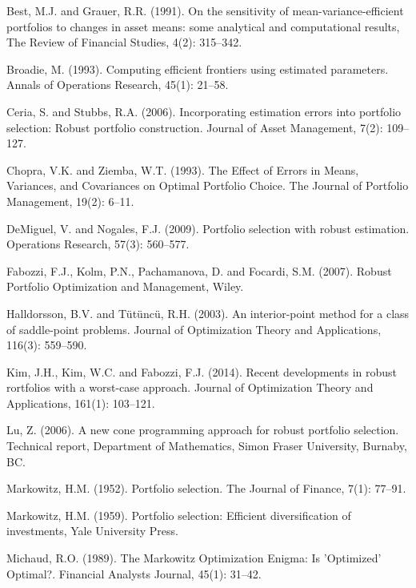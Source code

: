 \documentclass[12pt]{article}
\numberwithin{equation}{section}
\begin{document}
\begin{thebibliography}{plain}

Best, M.J. and Grauer, R.R. (1991).
On the sensitivity of mean-variance-efficient portfolios to changes in asset means: some analytical and computational results,
The Review of Financial Studies, 4(2): 315--342.

 Broadie, M. (1993).
Computing efficient frontiers using estimated parameters.
Annals of Operations Research, 45(1): 21--58.

Ceria, S. and Stubbs, R.A. (2006).
Incorporating estimation errors into portfolio selection: Robust portfolio construction.
Journal of Asset Management, 7(2): 109--127.

Chopra, V.K. and Ziemba, W.T. (1993).
The Effect of Errors in Means, Variances, and Covariances on Optimal Portfolio Choice.
The Journal of Portfolio Management, 19(2): 6--11.

DeMiguel, V. and Nogales, F.J. (2009).
Portfolio selection with robust estimation.
Operations Research, 57(3): 560--577.

Fabozzi, F.J., Kolm, P.N., Pachamanova, D. and Focardi, S.M. (2007).
Robust Portfolio Optimization and Management, Wiley.

 Halldorsson, B.V. and T{\"u}t{\"u}nc{\"u}, R.H. (2003).
An interior-point method for a class of saddle-point problems.
Journal of Optimization Theory and Applications, 116(3): 559--590.

 Kim, J.H., Kim, W.C. and Fabozzi, F.J. (2014).
Recent developments in robust rortfolios with a worst-case approach.
Journal of Optimization Theory and Applications, 161(1): 103--121.

 Lu, Z. (2006).
A new cone programming approach for robust portfolio selection.
Technical report, Department of Mathematics, Simon Fraser University, Burnaby, BC.

Markowitz, H.M. (1952). Portfolio selection.
The Journal of Finance, 7(1): 77--91.

Markowitz, H.M. (1959).
Portfolio selection: Efficient diversification of investments, Yale University Press.

Michaud, R.O. (1989). The Markowitz Optimization Enigma: Is 'Optimized' Optimal?.
Financial Analysts Journal, 45(1): 31--42.


\end{thebibliography}
\end{document}

